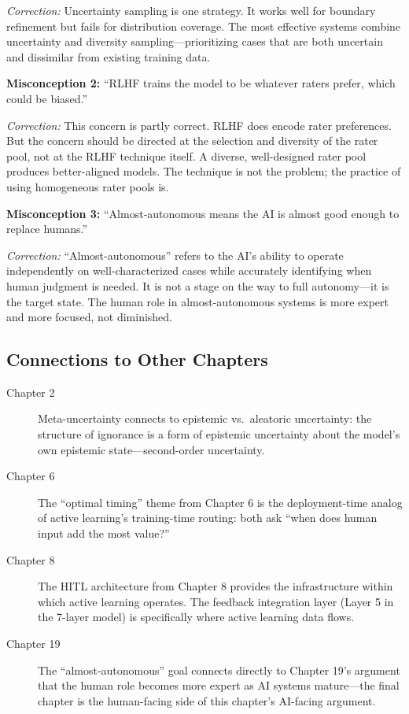 \textit{Correction:} Uncertainty sampling is one strategy. It works well for boundary refinement but fails for distribution coverage. The most effective systems combine uncertainty and diversity sampling---prioritizing cases that are both uncertain and dissimilar from existing training data.

\textbf{Misconception 2:} ``RLHF trains the model to be whatever raters prefer, which could be biased.''

\textit{Correction:} This concern is partly correct. RLHF does encode rater preferences. But the concern should be directed at the selection and diversity of the rater pool, not at the RLHF technique itself. A diverse, well-designed rater pool produces better-aligned models. The technique is not the problem; the practice of using homogeneous rater pools is.

\textbf{Misconception 3:} ``Almost-autonomous means the AI is almost good enough to replace humans.''

\textit{Correction:} ``Almost-autonomous'' refers to the AI's ability to operate independently on well-characterized cases while accurately identifying when human judgment is needed. It is not a stage on the way to full autonomy---it is the target state. The human role in almost-autonomous systems is more expert and more focused, not diminished.

\subsection*{Connections to Other Chapters}

\begin{description}
    \item[Chapter 2] Meta-uncertainty connects to epistemic vs.\ aleatoric uncertainty: the structure of ignorance is a form of epistemic uncertainty about the model's own epistemic state---second-order uncertainty.
    \item[Chapter 6] The ``optimal timing'' theme from Chapter 6 is the deployment-time analog of active learning's training-time routing: both ask ``when does human input add the most value?''
    \item[Chapter 8] The HITL architecture from Chapter 8 provides the infrastructure within which active learning operates. The feedback integration layer (Layer 5 in the 7-layer model) is specifically where active learning data flows.
    \item[Chapter 19] The ``almost-autonomous'' goal connects directly to Chapter 19's argument that the human role becomes more expert as AI systems mature---the final chapter is the human-facing side of this chapter's AI-facing argument.
\end{description}


